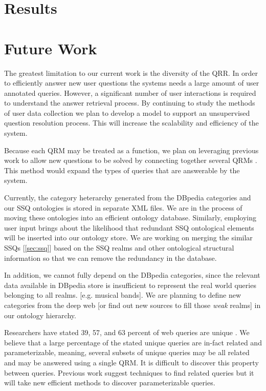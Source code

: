 \section{Results}

\section{Future Work}

The greatest limitation to our current work is the diversity of the QRR.  In order to efficiently answer new user questions the systems needs a large amount of user annotated queries.  However, a significant number of user interactions is required to understand the answer retrieval process.  By continuing to study the methods of user data collection we plan to develop a model to support an unsupervised question resolution process.  This will increase the scalability and efficiency of the system.

Because each QRM may be treated as a function, we plan on leveraging previous work to allow new questions to be solved by connecting together several QRMs \cite{morpheus1, transformscout}.  This method would expand the types of queries that are answerable by the system.

Currently, the category heterarchy generated from the DBpedia categories and our SSQ ontologies is stored in separate XML files. We are in the process of moving these ontologies into an efficient ontology database. Similarly, employing user input brings about the likelihood that redundant SSQ ontological elements will be inserted into our ontology store. We are working on merging the similar SSQs [\ref{sec:ssq}] based on the SSQ realms and other ontological structural information so that we can remove the redundancy in the database.

In addition, we cannot fully depend on the DBpedia categories, since the relevant data available in DBpedia store is insufficient to represent the real world queries belonging to all realms. [e.g. musical bands]. We are planning to define new categories from the deep web [or find out new sources to fill those \textit{weak} realms] in our ontology hierarchy.      


Researchers have stated 39, 57, and 63 percent of web queries are unique \cite{1277770,331405,621942}.  We believe that a large percentage of the stated unique queries are in-fact related and parameterizable, meaning, several subsets of unique queries may be all related and may be answered using a single QRM.  It is difficult to discover this property between queries.  Previous work suggest techniques to find related queries but it will take new efficient methods to discover parameterizable queries.

